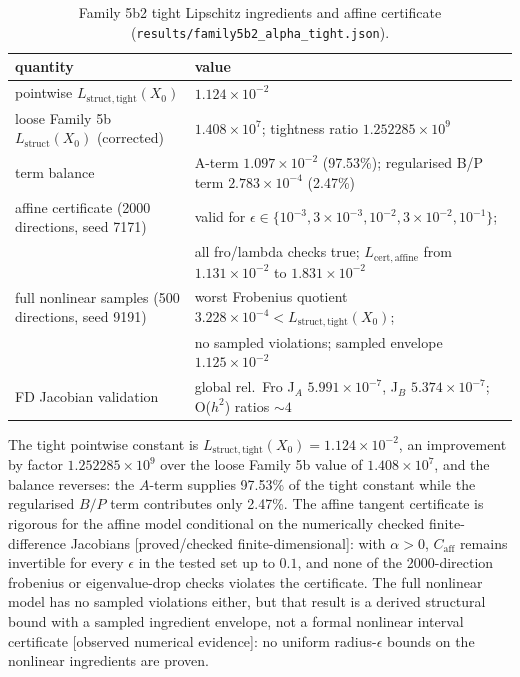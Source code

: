 \documentclass[12pt]{article}
\newcommand{\FDL}{\textnormal{[proved/checked finite-dimensional]}}
\newcommand{\OBS}{\textnormal{[observed numerical evidence]}}
\begin{document}
\begin{table}[htbp]
\centering
\small
\caption{Family 5b2 tight Lipschitz ingredients and affine certificate
(\texttt{results/family5b2\_alpha\_tight.json}).}
\label{tab:f5b2}
\begin{tabular}{p{} p{}}
\toprule
quantity & value \\
\midrule
pointwise $L_{\mathrm{struct,tight}}(X_0)$ &
$1.124\times10^{-2}$ \\
loose Family 5b $L_{\mathrm{struct}}(X_0)$ (corrected) &
$1.408\times10^7$; tightness ratio $1.252285\times10^9$ \\
term balance & A-term $1.097\times10^{-2}$ (97.53\%);
regularised B/P term $2.783\times10^{-4}$ (2.47\%) \\
affine certificate (2000 directions, seed 7171) &
valid for $\epsilon\in\{10^{-3},3\times10^{-3},10^{-2},3\times10^{-2},10^{-1}\}$; \\
 & all fro/lambda checks true; $L_{\mathrm{cert,affine}}$ from
$1.131\times10^{-2}$ to $1.831\times10^{-2}$ \\
full nonlinear samples (500 directions, seed 9191) &
worst Frobenius quotient $3.228\times10^{-4}<L_{\mathrm{struct,tight}}(X_0)$; \\
 & no sampled violations; sampled envelope $1.125\times10^{-2}$ \\
FD Jacobian validation & global rel.\ Fro J$_A$ $5.991\times10^{-7}$,
J$_B$ $5.374\times10^{-7}$; O($h^2$) ratios $\sim4$ \\
\bottomrule
\end{tabular}
\end{table}

The tight pointwise constant is $L_{\mathrm{struct,tight}}(X_0)=1.124\times10^{-2}$,
an improvement by factor $1.252285\times10^9$ over the loose Family 5b value
of $1.408\times10^7$, and the balance reverses: the $A$-term supplies 97.53\%
of the tight constant while the regularised $B/P$ term contributes only
2.47\%. The affine tangent certificate is rigorous for the affine model
conditional on the numerically checked finite-difference Jacobians \FDL{}:
with $\alpha>0$, $C_{\mathrm{aff}}$ remains invertible for every
$\epsilon$ in the tested set up to $0.1$, and none of the 2000-direction
frobenius or eigenvalue-drop checks violates the certificate. The full
nonlinear model has no sampled violations either, but that result is a
derived structural bound with a sampled ingredient envelope, not a formal
nonlinear interval certificate \OBS{}: no uniform radius-$\epsilon$ bounds
on the nonlinear ingredients are proven.
\end{document}
